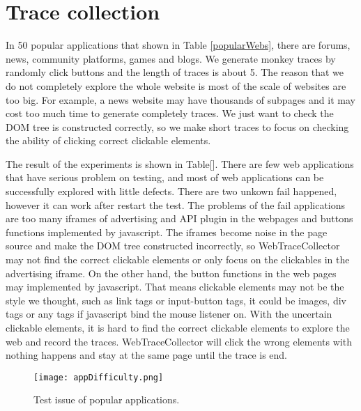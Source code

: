\section{Trace collection}

In 50 popular applications\cite{popularWebs} that shown in Table \ref{popularWebs},
there are forums, news, community platforms, games and blogs.
We generate monkey traces by randomly click buttons and the length of traces is about 5.
The reason that we do not completely explore the whole website is most of the scale of websites are too big.
For example, a news website may have thousands of subpages and it may cost too much time to generate completely traces.
We just want to check the DOM tree is constructed correctly, 
so we make short traces to focus on checking the ability of clicking correct clickable elements.

The result of the experiments is shown in Table[].
There are few web applications that have serious problem on testing,
and most of web applications can be successfully explored with little defects.
There are two unkown fail happened, however it can work after restart the test.
The problems of the fail applications are 
too many iframes of advertising and API plugin in the webpages and buttons functions implemented by javascript.
The iframes become noise in the page source and make the DOM tree constructed incorrectly,
so WebTraceCollector may not find the correct clickable elements or only focus on the clickables in the advertising iframe.
On the other hand, the button functions in the web pages may implemented by javascript.
That means clickable elements may not be the style we thought, such as link tags or input-button tags,
it could be images, div tags or any tags if javascript bind the mouse listener on.
With the uncertain clickable elements, it is hard to find the correct clickable elements to explore the web and record the traces.
WebTraceCollector will click the wrong elements with nothing happens and stay at the same page until the trace is end.

\begin{figure}[ht]
	\graphicspath{{pic/}}
	\begin{center}
		\texttt{[image: appDifficulty.png]}
	\end{center}
	\caption{ Test issue of popular applications. }
	\label{appDifficulty}
\end{figure}

